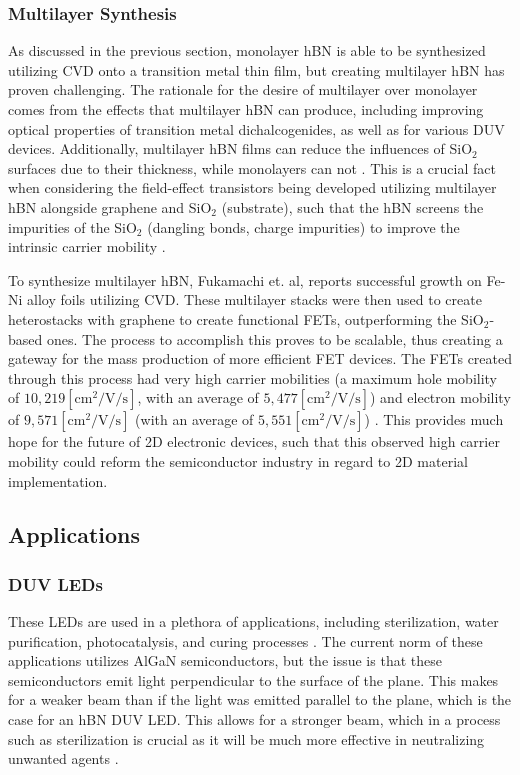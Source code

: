 \documentclass[conference]{IEEEtran}
\begin{document}
\subsubsection{Multilayer Synthesis}

As discussed in the previous section, monolayer hBN is able to be synthesized utilizing CVD onto a transition metal thin film, but creating multilayer hBN has proven challenging. The rationale for the desire of multilayer over monolayer comes from the effects that multilayer hBN can produce, including improving optical properties of transition metal dichalcogenides, as well as for various DUV devices. Additionally, multilayer hBN films can reduce the influences of SiO$_2$ surfaces due to their thickness, while monolayers can not \cite{jb3}. This is a crucial fact when considering the field-effect transistors being developed utilizing multilayer hBN alongside graphene and SiO$_2$ (substrate), such that the hBN screens the impurities of the SiO$_2$ (dangling bonds, charge impurities) to improve the intrinsic carrier mobility \cite{jb2}.

To synthesize multilayer hBN, Fukamachi et. al, reports successful growth on Fe-Ni alloy foils utilizing CVD. These multilayer stacks were then used to create heterostacks with graphene to create functional FETs, outperforming the SiO$_2$-based ones. The process to accomplish this proves to be scalable, thus creating a gateway for the mass production of more efficient FET devices. The FETs created through this process had very high carrier mobilities (a maximum hole mobility of $10,219[\si{\centi\meter\squared\per\volt\per\second}]$, with an average of $5,477[\si{\centi\meter\squared\per\volt\per\second}]$) and electron mobility of $9,571[\si{\centi\meter\squared\per\volt\per\second}]$ (with an average of $5,551[\si{\centi\meter\squared\per\volt\per\second}]$) \cite{jb3}. This provides much hope for the future of 2D electronic devices, such that this observed high carrier mobility could reform the semiconductor industry in regard to 2D material implementation.

  \subsection{Applications}

  \subsubsection{DUV LEDs}

  These LEDs are used in a plethora of applications, including sterilization, water purification, photocatalysis, and curing processes \cite{jb2}. The current norm of these applications utilizes AlGaN semiconductors, but the issue is that these semiconductors emit light perpendicular to the surface of the plane. This makes for a weaker beam than if the light was emitted parallel to the plane, which is the case for an hBN DUV LED. This allows for a stronger beam, which in a process such as sterilization is crucial as it will be much more effective in neutralizing unwanted agents \cite{jb1}.
\end{document}
